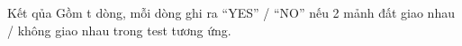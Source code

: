 Kết qủa
Gồm t dòng, mỗi dòng ghi ra “YES” / “NO” nếu 2 mảnh đất giao nhau / không giao nhau trong test tương ứng.